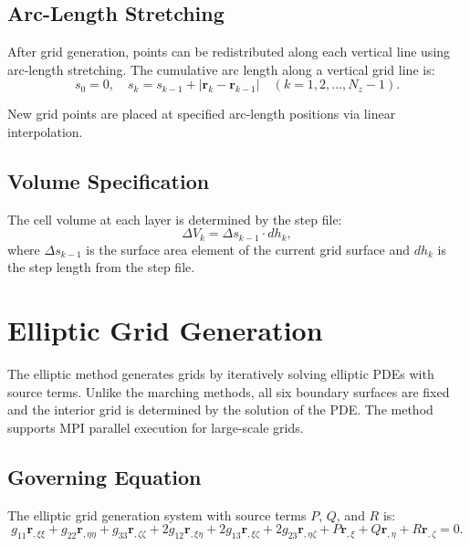 \documentclass[11pt,a4paper]{report}
\newcommand{\rvec}{\bm{r}}
\begin{document}
\section{Arc-Length Stretching}

After grid generation, points can be redistributed along each vertical line using arc-length stretching. The cumulative arc length along a vertical grid line is:
\begin{equation}
    s_0 = 0, \quad s_k = s_{k-1} + |\rvec_k - \rvec_{k-1}| \quad (k = 1, 2, \ldots, N_z-1).
\end{equation}

New grid points are placed at specified arc-length positions via linear interpolation.

\section{Volume Specification}

The cell volume at each layer is determined by the step file:
\begin{equation}
    \Delta V_k = \Delta s_{k-1} \cdot dh_k,
\end{equation}
where $\Delta s_{k-1}$ is the surface area element of the current grid surface and $dh_k$ is the step length from the step file.

\chapter{Elliptic Grid Generation}

The elliptic method generates grids by iteratively solving elliptic PDEs with source terms. Unlike the marching methods, all six boundary surfaces are fixed and the interior grid is determined by the solution of the PDE. The method supports MPI parallel execution for large-scale grids.

\section{Governing Equation}

The elliptic grid generation system with source terms $P$, $Q$, and $R$ is:
\begin{equation}
    g_{11} \rvec_{,\xi\xi} + g_{22} \rvec_{,\eta\eta} + g_{33} \rvec_{,\zeta\zeta}
    + 2g_{12} \rvec_{,\xi\eta} + 2g_{13} \rvec_{,\xi\zeta} + 2g_{23} \rvec_{,\eta\zeta}
    + P\rvec_{,\xi} + Q\rvec_{,\eta} + R\rvec_{,\zeta} = 0.
    \label{eq:ellip-gov}
\end{equation}
\end{document}
